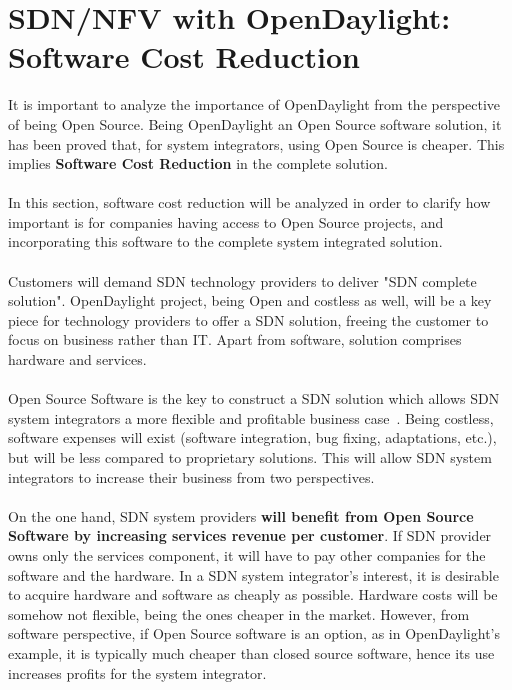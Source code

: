\documentclass[a4paper, 12pt]{book}
\begin{document}
\section{SDN/NFV with OpenDaylight: Software Cost Reduction}
\label{sec:odlsoftwarecostreduction}

It is important to analyze the importance of OpenDaylight from the perspective of being Open Source. Being OpenDaylight an Open Source software solution, it has been proved that, for system integrators, using Open Source is cheaper. This implies \textbf{Software Cost Reduction} in the complete solution.\\
\\
In this section, software cost reduction will be analyzed in order to clarify how important is for companies having access to Open Source projects, and incorporating this software to the complete system integrated solution.\\
\\
Customers will demand SDN technology providers to deliver "SDN complete solution". OpenDaylight project, being Open and costless as well, will be a key piece for technology providers to offer a SDN solution, freeing the customer to focus on business rather than IT. Apart from software, solution comprises hardware and services.\\
\\
Open Source Software is the key to construct a SDN solution which allows SDN system integrators a more flexible and profitable business case~\cite{EconomicMotivationOpenSource}. Being costless, software expenses will exist (software integration, bug fixing, adaptations, etc.), but will be less compared to proprietary solutions. This will allow SDN system integrators to increase their business from two perspectives.\\
\\
On the one hand, SDN system providers \textbf{will benefit from Open Source Software by increasing services revenue per customer}. If SDN provider owns only the services component, it will have to pay other companies for the software and the hardware. In a SDN system integrator's interest, it is desirable to acquire hardware and software as cheaply as possible. Hardware costs will be somehow not flexible, being the ones cheaper in the market. However, from software perspective, if Open Source software is an option, as in OpenDaylight's example, it is typically much cheaper than closed source software, hence its use increases profits for the system integrator.
\end{document}
